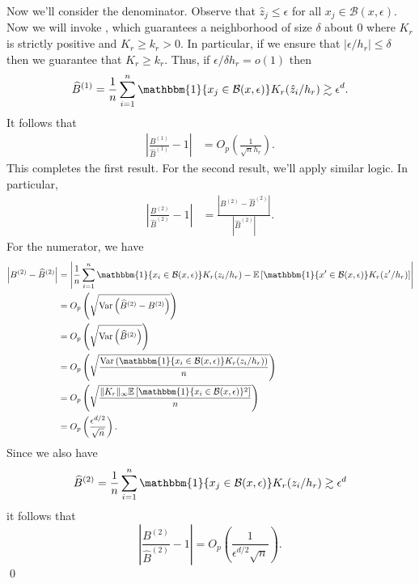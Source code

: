 \documentclass[11pt]{article}
\begin{document}
Now we'll consider the denominator. Observe that $\hat{z}_j \leq \epsilon$ for all $x_j \in \mathcal{B}(x, \epsilon)$. Now we will invoke , which guarantees a neighborhood of size $\delta$ about $0$ where $K_r$ is strictly positive and $K_r \geq k_r > 0$. In particular, if we ensure that $|\epsilon/h_r| \leq \delta$ then we guarantee that $K_r \geq k_r$. Thus, if $\epsilon/\delta h_r = o(1)$ then 
\[\widehat{B}^{(1)} = \frac{1}{n}\sum_{i = 1}^n\mathbbm{1}\{x_j \in \mathcal{B}(x, \epsilon)\}K_r(\hat{z}_i/h_r) \gtrsim \epsilon^d.\]
It follows that 
\begin{align}
    \left|\frac{B^{(1)}}{\widehat{B}^{(1)}} - 1\right| &= O_p\left(\frac{1}{\sqrt{n}h_r}\right).
\end{align}
This completes the first result. For the second result, we'll apply similar logic. In particular,
\begin{align}
    \left|\frac{B^{(2)}}{\widehat{B}^{(2)}} - 1\right| &= \frac{\left|B^{(2)} - \widehat{B}^{(2)}\right|}{\left|\widehat{B}^{(2)}\right|}.
\end{align}
For the numerator, we have 
\begin{align}
    \left|B^{(2)} - \widehat{B}^{(2)}\right| &= \left|\frac{1}{n}\sum_{i = 1}^n\mathbbm{1}\{x_i \in \mathcal{B}(x, \epsilon)\}K_r(z_i/h_r) - \mathbb{E}\left[\mathbbm{1}\{x' \in \mathcal{B}(x, \epsilon)\}K_r(z'/h_r)\right]\right| \\
    &= O_p\left(\sqrt{\text{Var}\left(\widehat{B}^{(2)} - B^{(2)}\right)}\right) \\
    &= O_p\left(\sqrt{\text{Var}\left(\widehat{B}^{(2)}\right)}\right) \\
    &= O_p\left(\sqrt{\frac{\text{Var}\left(\mathbbm{1}\{x_i \in \mathcal{B}(x, \epsilon)\}K_r(z_i/h_r)\right)}{n}}\right) \\
    &= O_p\left(\sqrt{\frac{\|K_r\|_{\infty}\mathbb{E}\left[\mathbbm{1}\{x_i \in \mathcal{B}(x, \epsilon)\}^2\right]}{n}}\right) \\
    &= O_p\left(\frac{\epsilon^{d/2}}{\sqrt{n}}\right).
\end{align}
Since we also have 
\[\widehat{B}^{(2)} = \frac{1}{n}\sum_{i = 1}^n\mathbbm{1}\{x_j \in \mathcal{B}(x, \epsilon)\}K_r(z_i/h_r) \gtrsim \epsilon^d\]
it follows that 
\begin{equation}
    \left|\frac{B^{(2)}}{\widehat{B}^{(2)}} - 1\right| = O_p\left(\frac{1}{\epsilon^{d/2}\sqrt{n}}\right).
\end{equation}
\qed{}
\end{document}
